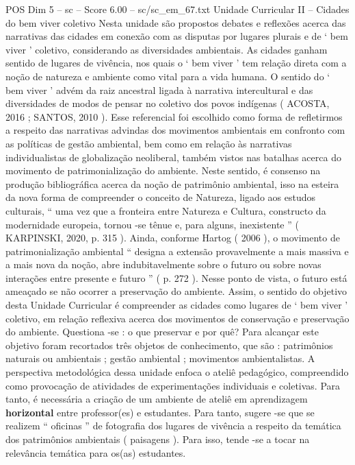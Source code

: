 \begin{textsample}{POS Dim 5 – sc – Score 6.00 – sc/sc\_em\_67.txt}
Unidade Curricular II – Cidades do bem viver coletivo Nesta unidade são propostos debates e reflexões acerca das narrativas das cidades em conexão com as disputas por lugares plurais e de ‘ bem viver ’ coletivo, considerando as diversidades ambientais.
As cidades ganham sentido de lugares de vivência, nos quais o ‘ bem viver ’ tem relação direta com a noção de natureza e ambiente como vital para a vida humana.
O sentido do ‘ bem viver ’ advém da raiz ancestral ligada à narrativa intercultural e das diversidades de modos de pensar no coletivo dos povos indígenas ( ACOSTA, 2016 ; SANTOS, 2010 ).
Esse referencial foi escolhido como forma de refletirmos a respeito das narrativas advindas dos movimentos ambientais em confronto com as políticas de gestão ambiental, bem como em relação às narrativas individualistas de globalização neoliberal, também vistos nas batalhas acerca do movimento de patrimonialização do ambiente.
Neste sentido, é consenso na produção bibliográfica acerca da noção de patrimônio ambiental, isso na esteira da nova forma de compreender o conceito de Natureza, ligado aos estudos culturais, “ uma vez que a fronteira entre Natureza e Cultura, constructo da modernidade europeia, tornou -se tênue e, para alguns, inexistente ” ( KARPINSKI, 2020, p. 315 ).
Ainda, conforme Hartog ( 2006 ), o movimento de patrimonialização ambiental “ designa a extensão provavelmente a mais massiva e a mais nova da noção, abre indubitavelmente sobre o futuro ou sobre novas interações entre presente e futuro ” ( p. 272 ).
Nesse ponto de vista, o futuro está ameaçado se não ocorrer a preservação do ambiente.
Assim, o sentido do objetivo desta Unidade Curricular é compreender as cidades como lugares de ‘ bem viver ’ coletivo, em relação reflexiva acerca dos movimentos de conservação e preservação do ambiente.
Questiona -se : o que preservar e por quê?
Para alcançar este objetivo foram recortados três objetos de conhecimento, que são : patrimônios naturais ou ambientais ; gestão ambiental ; movimentos ambientalistas.
A perspectiva metodológica dessa unidade enfoca o ateliê pedagógico, compreendido como provocação de atividades de experimentações individuais e coletivas.
Para tanto, é necessária a criação de um ambiente de ateliê em aprendizagem \textbf{horizontal} entre professor(es) e estudantes.
Para tanto, sugere -se que se realizem “ oficinas ” de fotografia dos lugares de vivência a respeito da temática dos patrimônios ambientais ( paisagens ).
Para isso, tende -se a tocar na relevância temática para os(as) estudantes.

\end{textsample}
